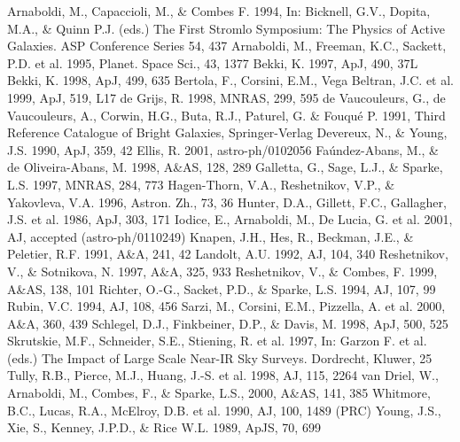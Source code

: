 \documentclass{aa}
\begin{document}
\begin{thebibliography}{}

 Arnaboldi, M., Capaccioli, M., \& Combes F. 1994, 
In: Bicknell, G.V., Dopita, M.A., \& Quinn P.J. (eds.) The First
Stromlo Symposium: The Physics of Active Galaxies. ASP Conference
Series 54, 437
 Arnaboldi, M., Freeman, K.C., Sackett, P.D. et al. 1995,
Planet. Space Sci., 43, 1377
\bibitem{} Bekki, K. 1997, ApJ, 490, 37L
\bibitem{} Bekki, K. 1998, ApJ, 499, 635
 Bertola, F., Corsini, E.M., Vega Beltran, J.C. et al. 1999,
ApJ, 519, L17
\bibitem{} de Grijs, R. 1998, MNRAS, 299, 595
 de Vaucouleurs, G., de Vaucouleurs, A., Corwin, H.G., Buta, R.J.,
Paturel, G. \& Fouqu\'{e} P. 1991, Third Reference Catalogue of Bright Galaxies,
      Springer-Verlag
 Devereux, N., \& Young, J.S. 1990, ApJ, 359, 42
 Ellis, R. 2001, astro-ph/0102056
 Fa\'{u}ndez-Abans, M., \& de Oliveira-Abans, M. 1998, A\&AS, 128,
289
 Galletta, G., Sage, L.J., \& Sparke, L.S. 1997, MNRAS, 284, 773
\bibitem{} Hagen-Thorn, V.A., Reshetnikov, V.P., \& Yakovleva, V.A. 1996,
Astron. Zh., 73, 36
 Hunter, D.A., Gillett, F.C., Gallagher, J.S. et al. 1986,
ApJ, 303, 171
\bibitem{} Iodice, E., Arnaboldi, M., De Lucia, G. et al. 2001, AJ, accepted
(astro-ph/0110249)
 Knapen, J.H., Hes, R., Beckman, J.E., \& Peletier, R.F.
1991, A\&A, 241, 42
 Landolt, A.U. 1992, AJ, 104, 340
 Reshetnikov, V., \& Sotnikova, N. 1997, A\&A, 325, 933
 Reshetnikov, V., \& Combes, F. 1999, A\&AS, 138, 101
 Richter, O.-G., Sacket, P.D., \& Sparke, L.S. 1994, AJ, 107, 99
 Rubin, V.C. 1994, AJ, 108, 456
 Sarzi, M., Corsini, E.M., Pizzella, A. et al. 2000, A\&A, 360, 439
 Schlegel, D.J., Finkbeiner, D.P., \& Davis, M. 1998, ApJ, 500, 525
 Skrutskie, M.F., Schneider, S.E., Stiening, R. et al. 1997,
In: Garzon F. et al. (eds.) The Impact of Large Scale Near-IR Sky Surveys.
Dordrecht, Kluwer, 25
 Tully, R.B., Pierce, M.J., Huang, J.-S. et al. 1998, AJ, 115,
2264
 van Driel, W., Arnaboldi, M., Combes, F., \& Sparke, L.S., 2000,
A\&AS, 141, 385
 Whitmore, B.C., Lucas, R.A., McElroy, D.B. et al. 1990, AJ, 100,
1489 (PRC)
 Young, J.S., Xie, S., Kenney, J.P.D., \& Rice W.L. 1989, ApJS, 70, 699

\end{thebibliography}
\end{document}
